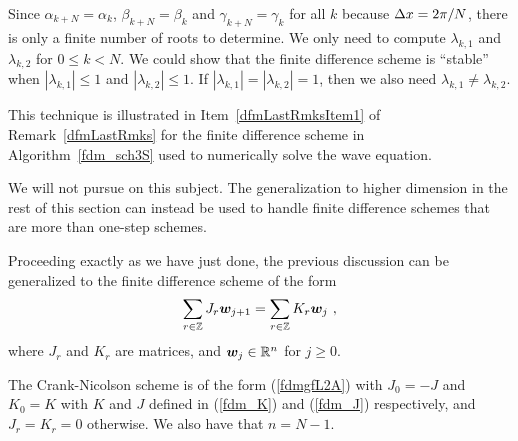 \begin{rmk}
Since $\alpha_{k+N} = \alpha_k$, $\beta_{k+N} = \beta_k$ and
$\gamma_{k+N} = \gamma_k$ for all $k$ because $\Delta{x} = 2\pi/N$,
there is only a finite number of roots to determine.  We
only need to compute $\lambda_{k,1}$ and $\lambda_{k,2}$ for
$0 \leq k < N$.
We could show that the finite difference scheme is ``stable'' when
$|\lambda_{k,1}| \leq 1$ and $|\lambda_{k,2}| \leq 1$.  If
$|\lambda_{k,1}| = |\lambda_{k,2}|=1$, then we also need
$\lambda_{k,1} \neq \lambda_{k,2}$.

This technique is illustrated in Item~\ref{dfmLastRmksItem1} of
Remark~\ref{dfmLastRmks} for the finite difference
scheme in Algorithm~\ref{fdm_sch3S} used to numerically solve the wave
equation.

We will not pursue on this subject.  The generalization to higher
dimension in the rest of this section can instead be used to handle
finite difference schemes that are more than one-step schemes.
\end{rmk}

Proceeding exactly as we have just done, the previous discussion can
be generalized to the finite difference scheme of the form
\begin{equation} \label{fdmgfL2D}
\sum_{r\in \ZZ} J_r \VEC{w}_{j+1} = \sum_{r\in \ZZ} K_r \VEC{w}_j \ ,
\end{equation}
where $J_r$ and $K_r$ are \nn matrices, and $\bm{w}_j \in \mathbb{R}^n$ for
$j\geq 0$.

\begin{egg}
The Crank-Nicolson scheme is of the form (\ref{fdmgfL2A}) with
$J_0 = -J$ and $K_0 = K$ with $K$ and $J$ defined in (\ref{fdm_K}) and
(\ref{fdm_J}) respectively, and $J_r=K_r= 0$ otherwise.  We also have
that $n= N-1$.
\end{egg}

